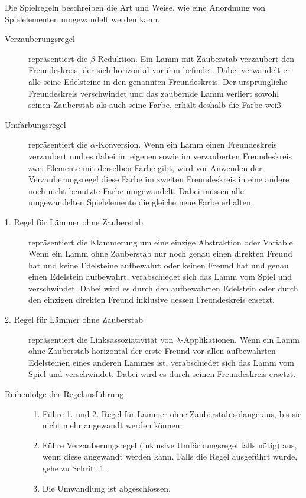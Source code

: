 Die Spielregeln beschreiben die Art und Weise, wie eine Anordnung von Spielelementen umgewandelt werden kann. 

\begin{description}
\item[Verzauberungsregel] repräsentiert die $\beta$-Reduktion. Ein Lamm mit Zauberstab verzaubert den Freundeskreis, der sich horizontal vor ihm befindet. Dabei verwandelt er alle seine Edelsteine in den genannten Freundeskreis. Der ursprüngliche Freundeskreis verschwindet und das zaubernde Lamm verliert sowohl seinen Zauberstab als auch seine Farbe, erhält deshalb die Farbe weiß.
\item[Umfärbungsregel] repräsentiert die $\alpha$-Konversion. Wenn ein Lamm einen Freundeskreis verzaubert und es dabei im eigenen sowie im verzauberten Freundeskreis zwei Elemente mit derselben Farbe gibt, wird vor Anwenden der Verzauberungsregel diese Farbe im zweiten Freundeskreis in eine andere noch nicht benutzte Farbe umgewandelt. Dabei müssen alle umgewandelten Spielelemente die gleiche neue Farbe erhalten.
\item[1. Regel für Lämmer ohne Zauberstab] repräsentiert die Klammerung um eine einzige Abstraktion oder Variable. Wenn ein Lamm ohne Zauberstab nur noch genau einen direkten Freund hat und keine Edelsteine aufbewahrt oder keinen Freund hat und genau einen Edelstein aufbewahrt, verabschiedet sich das Lamm vom Spiel und verschwindet. Dabei wird es durch den aufbewahrten Edelstein oder durch den einzigen direkten Freund inklusive dessen Freundeskreis ersetzt.
\item[2. Regel für Lämmer ohne Zauberstab] repräsentiert die Linksassoziativität von $\lambda$-Applikationen. Wenn ein Lamm ohne Zauberstab horizontal der erste Freund vor allen aufbewahrten Edelsteinen eines anderen Lammes ist, verabschiedet sich das Lamm vom Spiel und verschwindet. Dabei wird es durch seinen Freundeskreis ersetzt.
\item[Reihenfolge der Regelausführung] \hfill
\begin{enumerate}
\item Führe 1. und 2. Regel für Lämmer ohne Zauberstab solange aus, bis sie nicht mehr angewandt werden können.
\item Führe Verzauberungsregel $($inklusive Umfärbungsregel falls nötig$)$ aus, wenn diese angewandt werden kann. Falls die Regel ausgeführt wurde, gehe zu Schritt 1.
\item Die Umwandlung ist abgeschlossen.
\end{enumerate}
\end{description}


